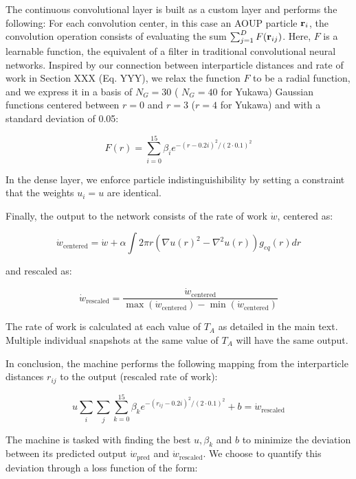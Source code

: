 \documentclass[superscriptaddress, amsmath,preprintnumbers,10pt,article,notitlepage]{revtex4-1}
\begin{document}
The continuous convolutional layer is built as a custom layer and performs the following:
For each convolution center, in this case an AOUP particle ${\bf r}_i$, the convolution operation consists of evaluating the sum $\sum_{j=1}^{D} F({\bf r}_{ij})$. Here, $F$ is a learnable function, the equivalent of a filter in traditional convolutional neural networks.  Inspired by our connection between interparticle distances and rate of work in Section XXX (Eq. YYY), we relax the function $F$ to be a radial function, and we express it in a basis of $N_G=30 $ ( $N_G=40 $  for Yukawa) Gaussian functions centered between $r=0$ and $r=3$ ($r = 4$ for  Yukawa) and with a standard deviation of 0.05:

\begin{equation}
    F(r) = \sum_{i=0}^{15} \beta_i e^{-(r-0.2 i)^2/(2\cdot 0.1)^2}
\end{equation}

In the dense layer, we enforce particle indistinguishibility by setting a constraint that the weights $u_i = u $ are identical. 

Finally, the output to the network consists of the rate of work $\dot{w}$, centered as:

\begin{equation}
    \dot{w}_{\text{centered}} = \dot{w} + \alpha \int 2\pi r (\nabla u(r)^2 - \nabla^2 u(r)) g_{eq}(r) dr
\end{equation}

and rescaled as:

\begin{equation}
    \dot{w}_{\text{rescaled}} = \dfrac{\dot{w}_{\text{centered}}}{\max(\dot{w}_{\text{centered}}) - \min(\dot{w}_{\text{centered}} )}
\end{equation}

The rate of work is calculated at each value of $T_A$ as detailed in the main text. Multiple individual snapshots at the same value of $T_A$ will have the same output.

In conclusion, the machine performs the following mapping from the interparticle distances $r_{ij}$ to the output (rescaled rate of work):

\begin{equation}
     u \sum_i \sum_{j} \sum_{k=0}^{15} \beta_k e^{-(r_{ij}-0.2 i)^2/(2\cdot 0.1)^2} + b = \dot{w}_{\text{rescaled}}
\end{equation}

The machine is tasked with finding the best $u, \beta_k$ and $b$ to minimize the deviation between its predicted output $\dot{w}_{\text{pred}}$ and $\dot{w}_{\text{rescaled}}$. We choose to quantify this deviation through a loss function of the form:
\end{document}
